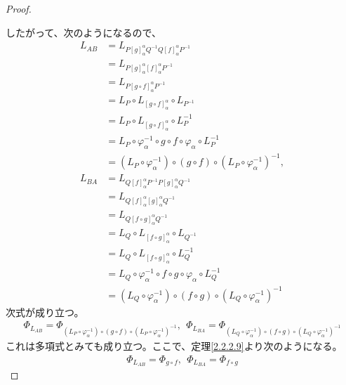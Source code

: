 \documentclass[dvipdfmx]{jsarticle}
\begin{document}
\begin{proof}
\begin{center}
\begin{tikzpicture}[auto]
  \end{tikzpicture}
\end{center}
したがって、次のようになるので、
\begin{align*}
L_{AB} &= L_{P[ g]_{\alpha}^{\alpha}Q^{- 1}Q[ f]_{\alpha}^{\alpha}P^{- 1}}\\
&= L_{P[ g]_{\alpha}^{\alpha}[ f]_{\alpha}^{\alpha}P^{- 1}}\\
&= L_{P[ g \circ f]_{\alpha}^{\alpha}P^{- 1}}\\
&= L_{P} \circ L_{[ g \circ f]_{\alpha}^{\alpha}} \circ L_{P^{- 1}}\\
&= L_{P} \circ L_{[ g \circ f]_{\alpha}^{\alpha}} \circ L_{P}^{- 1}\\
&= L_{P} \circ \varphi_{\alpha}^{- 1} \circ g \circ f \circ \varphi_{\alpha} \circ L_{P}^{- 1}\\
&= \left( L_{P} \circ \varphi_{\alpha}^{- 1} \right) \circ (g \circ f) \circ \left( L_{P} \circ \varphi_{\alpha}^{- 1} \right)^{- 1}, \\
L_{BA} &= L_{Q[ f]_{\alpha}^{\alpha}P^{- 1}P[ g]_{\alpha}^{\alpha}Q^{- 1}}\\
&= L_{Q[ f]_{\alpha}^{\alpha}[ g]_{\alpha}^{\alpha}Q^{- 1}}\\
&= L_{Q[ f \circ g]_{\alpha}^{\alpha}Q^{- 1}}\\
&= L_{Q} \circ L_{[ f \circ g]_{\alpha}^{\alpha}} \circ L_{Q^{- 1}}\\
&= L_{Q} \circ L_{[ f \circ g]_{\alpha}^{\alpha}} \circ L_{Q}^{- 1}\\
&= L_{Q} \circ \varphi_{\alpha}^{- 1} \circ f \circ g \circ \varphi_{\alpha} \circ L_{Q}^{- 1}\\
&= \left( L_{Q} \circ \varphi_{\alpha}^{- 1} \right) \circ (f \circ g) \circ \left( L_{Q} \circ \varphi_{\alpha}^{- 1} \right)^{- 1}
\end{align*}
次式が成り立つ。
\begin{align*}
\varPhi_{L_{AB}} = \varPhi_{\left( L_{P} \circ \varphi_{\alpha}^{- 1} \right) \circ (g \circ f) \circ \left( L_{P} \circ \varphi_{\alpha}^{- 1} \right)^{- 1}},\ \ \varPhi_{L_{BA}} = \varPhi_{\left( L_{Q} \circ \varphi_{\alpha}^{- 1} \right) \circ (f \circ g) \circ \left( L_{Q} \circ \varphi_{\alpha}^{- 1} \right)^{- 1}}
\end{align*}
これは多項式とみても成り立つ。ここで、定理\ref{2.2.2.9}より次のようになる。
\begin{align*}
\varPhi_{L_{AB}} = \varPhi_{g \circ f},\ \ \varPhi_{L_{BA}} = \varPhi_{f \circ g}
\end{align*}\par

\end{proof}
\end{document}
